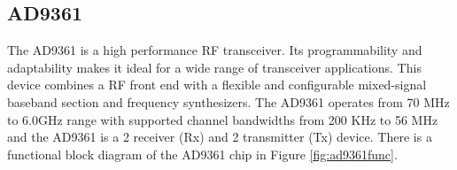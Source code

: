 \subsection{AD9361}
\label{trans:ad9361}

The AD9361 is a high performance RF transceiver. Its programmability and
adaptability makes it ideal for a wide range of transceiver applications. This
device combines a RF front end with a flexible and configurable mixed-signal
baseband section and frequency synthesizers. The AD9361 operates from 70 MHz to
6.0GHz range with supported channel bandwidths from 200 KHz to 56 MHz and the
AD9361 is a 2 receiver (Rx) and 2 transmitter (Tx) device. There is a functional
block diagram of the AD9361 chip in Figure \ref{fig:ad9361func}.

%
%
